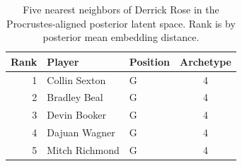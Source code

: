 \begin{table}[htbp]
  \centering\small
  \begin{tabular}{rllc}
    \toprule
    Rank & Player & Position & Archetype \\
    \midrule
    1 & Collin Sexton & G & 4 \\
    2 & Bradley Beal & G & 4 \\
    3 & Devin Booker & G & 4 \\
    4 & Dajuan Wagner & G & 4 \\
    5 & Mitch Richmond & G & 4 \\
    \bottomrule
  \end{tabular}
  \caption{Five nearest neighbors of Derrick Rose in the Procrustes-aligned posterior latent space. Rank is by posterior mean embedding distance.}
  \label{tab:Derrick_Rose_neighbors}
\end{table}

